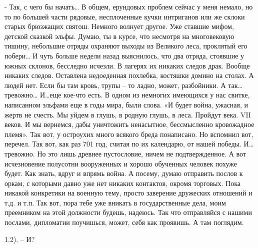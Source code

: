 \documentclass[12pt,a4paper]{book}
\begin{document}
- Так, с чего бы начать… В общем, ерундовых проблем сейчас у меня немало, но то по большей части рядовые, несплоченные кучки интриганов или же склоки старых брюзжащих святош. Немного волнует другое. Уже ставшие мифом, детской сказкой эльфы. Думаю, ты в курсе, что несмотря на многовековую тишину, небольшие отряды охраняют выходы из Великого леса, проклятый его побери… И чуть больше недели назад выяснилось, что два отряда, стоявшие у южных склонов, бесследно исчезли. В лагерях их никаких следов драк. Вообще никаких следов. Оставлена недоеденная похлебка, костяшки домино на столах. А людей нет. Если бы там кровь, трупы – то ладно, может, разбойники. А так…тревожно… И…еще кое-что есть. В одном из немногих имеющихся у нас свитке, написанном эльфами еще в годы мира, были слова. «И будет война, ужасная, и жертв не счесть. Мы уйдем в глушь, в родную глушь, в леса. Пройдут века. VII веков. И мы вернемся, дабы уничтожить ненасытное, бессмысленно кровожадное племя». Так вот, у остроухих много всякого бреда понаписано. Но вспомнил вот, перечел. Так вот, как раз 701 год, считая по их календарю, от нашей победы. И… тревожно. Но это лишь древнее пустословие, ничем не подтвержденное. А вот исчезновение полусотни вооруженных и хорошо обученных человек похуже будет. Как знать, вдруг и впрямь война. А посему, думаю отправить послов к оркам, с которыми давно уже нет никаких контактов, окромя торговых. Пока никакой конкретики на военную тему, просто заверение дружеских отношений и т.д. и т.п. Так вот, пора тебе уже вникать в государственные дела, моим преемником на этой должности будешь, надеюсь. Так что отправляйся с нашими послами, дипломатии поучишься, может, себя как проявишь. А там поглядим.

1.2). – И?
\end{document}
